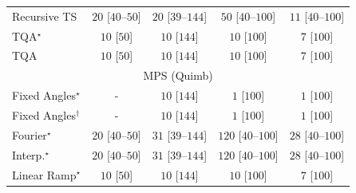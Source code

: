 \begin{tabular}{l|cccc|}
Recursive TS & {\cellcolor[HTML]{F4FBF1}} \color[HTML]{000000} $20$ [$40$--$50$] & {\cellcolor[HTML]{F4FBF1}} \color[HTML]{000000} $20$ [$39$--$144$] & {\cellcolor[HTML]{EEF8EA}} \color[HTML]{000000} $50$ [$40$--$100$] & {\cellcolor[HTML]{F5FBF3}} \color[HTML]{000000} $11$ [$40$--$100$] \\
TQA$^\star$ & {\cellcolor[HTML]{F6FCF4}} \color[HTML]{000000} $10$ [$50$] & {\cellcolor[HTML]{F6FCF4}} \color[HTML]{000000} $10$ [$144$] & {\cellcolor[HTML]{F6FCF4}} \color[HTML]{000000} $10$ [$100$] & {\cellcolor[HTML]{F6FCF4}} \color[HTML]{000000} $7$ [$100$] \\
TQA & {\cellcolor[HTML]{F6FCF4}} \color[HTML]{000000} $10$ [$50$] & {\cellcolor[HTML]{F6FCF4}} \color[HTML]{000000} $10$ [$144$] & {\cellcolor[HTML]{F6FCF4}} \color[HTML]{000000} $10$ [$100$] & {\cellcolor[HTML]{F6FCF4}} \color[HTML]{000000} $7$ [$100$] \\
\cline{1-5}
\multicolumn{5}{c}{\rule{0pt}{8pt}MPS (Quimb)} \\
\midrule
Fixed Angles$^\star$ & {\cellcolor[HTML]{000000}} \color[HTML]{F1F1F1} {\cellcolor{white}} \color{black} - & {\cellcolor[HTML]{F6FCF4}} \color[HTML]{000000} $10$ [$144$] & {\cellcolor[HTML]{F7FCF5}} \color[HTML]{000000} $1$ [$100$] & {\cellcolor[HTML]{F7FCF5}} \color[HTML]{000000} $1$ [$100$] \\
Fixed Angles$^\dagger$ & {\cellcolor[HTML]{000000}} \color[HTML]{F1F1F1} {\cellcolor{white}} \color{black} - & {\cellcolor[HTML]{F6FCF4}} \color[HTML]{000000} $10$ [$144$] & {\cellcolor[HTML]{F7FCF5}} \color[HTML]{000000} $1$ [$100$] & {\cellcolor[HTML]{F7FCF5}} \color[HTML]{000000} $1$ [$100$] \\
Fourier$^\star$ & {\cellcolor[HTML]{F4FBF1}} \color[HTML]{000000} $20$ [$40$--$50$] & {\cellcolor[HTML]{F2FAEF}} \color[HTML]{000000} $31$ [$39$--$144$] & {\cellcolor[HTML]{DEF2D9}} \color[HTML]{000000} $120$ [$40$--$100$] & {\cellcolor[HTML]{F2FAF0}} \color[HTML]{000000} $28$ [$40$--$100$] \\
Interp.$^\star$ & {\cellcolor[HTML]{F4FBF1}} \color[HTML]{000000} $20$ [$40$--$50$] & {\cellcolor[HTML]{F2FAEF}} \color[HTML]{000000} $31$ [$39$--$144$] & {\cellcolor[HTML]{DEF2D9}} \color[HTML]{000000} $120$ [$40$--$100$] & {\cellcolor[HTML]{F2FAF0}} \color[HTML]{000000} $28$ [$40$--$100$] \\
Linear Ramp$^\star$ & {\cellcolor[HTML]{F6FCF4}} \color[HTML]{000000} $10$ [$50$] & {\cellcolor[HTML]{F6FCF4}} \color[HTML]{000000} $10$ [$144$] & {\cellcolor[HTML]{F6FCF4}} \color[HTML]{000000} $10$ [$100$] & {\cellcolor[HTML]{F6FCF4}} \color[HTML]{000000} $7$ [$100$] \\

\end{tabular}
